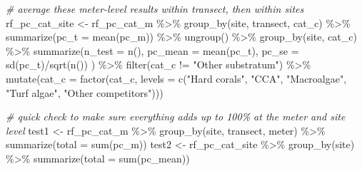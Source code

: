 \documentclass[
]{article}
\newenvironment{Shaded}{\begin{snugshade}}{\end{snugshade}}
\newcommand{\AttributeTok}[1]{\textcolor[rgb]{0.77,0.63,0.00}{#1}}
\newcommand{\CommentTok}[1]{\textcolor[rgb]{0.56,0.35,0.01}{\textit{#1}}}
\newcommand{\FunctionTok}[1]{\textcolor[rgb]{0.00,0.00,0.00}{#1}}
\newcommand{\NormalTok}[1]{#1}
\newcommand{\OtherTok}[1]{\textcolor[rgb]{0.56,0.35,0.01}{#1}}
\newcommand{\SpecialCharTok}[1]{\textcolor[rgb]{0.00,0.00,0.00}{#1}}
\newcommand{\StringTok}[1]{\textcolor[rgb]{0.31,0.60,0.02}{#1}}
\begin{document}
\begin{Shaded}
\begin{Highlighting}[]
\CommentTok{\# average these meter{-}level results within transect, then within sites}
\NormalTok{rf\_pc\_cat\_site }\OtherTok{\textless{}{-}}\NormalTok{ rf\_pc\_cat\_m }\SpecialCharTok{\%\textgreater{}\%}
  \FunctionTok{group\_by}\NormalTok{(site, transect, cat\_c) }\SpecialCharTok{\%\textgreater{}\%}
  \FunctionTok{summarize}\NormalTok{(}\AttributeTok{pc\_t =} \FunctionTok{mean}\NormalTok{(pc\_m)) }\SpecialCharTok{\%\textgreater{}\%}
  \FunctionTok{ungroup}\NormalTok{() }\SpecialCharTok{\%\textgreater{}\%}
  \FunctionTok{group\_by}\NormalTok{(site, cat\_c) }\SpecialCharTok{\%\textgreater{}\%}
  \FunctionTok{summarize}\NormalTok{(}\AttributeTok{n\_test =} \FunctionTok{n}\NormalTok{(),}
            \AttributeTok{pc\_mean =} \FunctionTok{mean}\NormalTok{(pc\_t),}
            \AttributeTok{pc\_se =} \FunctionTok{sd}\NormalTok{(pc\_t)}\SpecialCharTok{/}\FunctionTok{sqrt}\NormalTok{(}\FunctionTok{n}\NormalTok{())}
\NormalTok{            ) }\SpecialCharTok{\%\textgreater{}\%}
  \FunctionTok{filter}\NormalTok{(cat\_c }\SpecialCharTok{!=} \StringTok{"Other substratum"}\NormalTok{) }\SpecialCharTok{\%\textgreater{}\%} 
  \FunctionTok{mutate}\NormalTok{(}\AttributeTok{cat\_c =} \FunctionTok{factor}\NormalTok{(cat\_c, }\AttributeTok{levels =} \FunctionTok{c}\NormalTok{(}\StringTok{"Hard corals"}\NormalTok{, }\StringTok{"CCA"}\NormalTok{, }\StringTok{"Macroalgae"}\NormalTok{, }\StringTok{"Turf algae"}\NormalTok{, }\StringTok{"Other competitors"}\NormalTok{)))}

\CommentTok{\# quick check to make sure everything adds up to 100\% at the meter and site level}
\NormalTok{test1 }\OtherTok{\textless{}{-}}\NormalTok{ rf\_pc\_cat\_m }\SpecialCharTok{\%\textgreater{}\%}
  \FunctionTok{group\_by}\NormalTok{(site, transect, meter) }\SpecialCharTok{\%\textgreater{}\%}
  \FunctionTok{summarize}\NormalTok{(}\AttributeTok{total =} \FunctionTok{sum}\NormalTok{(pc\_m))}
\NormalTok{test2 }\OtherTok{\textless{}{-}}\NormalTok{ rf\_pc\_cat\_site }\SpecialCharTok{\%\textgreater{}\%}
  \FunctionTok{group\_by}\NormalTok{(site) }\SpecialCharTok{\%\textgreater{}\%}
  \FunctionTok{summarize}\NormalTok{(}\AttributeTok{total =} \FunctionTok{sum}\NormalTok{(pc\_mean))}
\end{Highlighting}
\end{Shaded}
\end{document}
